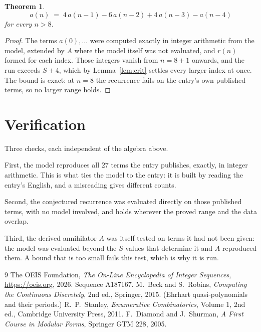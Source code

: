 \documentclass[11pt,a4paper]{article}
\theoremstyle{plain}
\newtheorem{theorem}{Theorem}
\theoremstyle{definition}
\begin{document}
\begin{theorem}
\[
a(n)\;=\;4\,a(n-1) - 6\,a(n-2) + 4\,a(n-3) - a(n-4)
\]
for every $n>8$.
\end{theorem}

\begin{proof}
The terms $a(0),\dots$ were computed exactly in integer arithmetic from the model, extended by
$A$ where the model itself was not evaluated, and $r(n)$ formed for each index. Those integers
vanish from $n=8+1$ onwards, and the run exceeds $S+4$, which by
Lemma~\ref{lem:crit} settles every larger index at once. The bound is exact: at $n=8$ the recurrence fails on the entry's own published terms, so no larger range holds.
\end{proof}

\section{Verification}

Three checks, each independent of the algebra above.

First, the model reproduces all $27$ terms the entry publishes, exactly, in integer
arithmetic. This is what ties the model to the entry: it is built by reading the entry's
English, and a misreading gives different counts.

Second, the conjectured recurrence was evaluated directly on those published terms, with no
model involved, and holds wherever the proved range and the data overlap.

Third, the derived annihilator $A$ was itself tested on terms it had not been given: the model
was evaluated beyond the $S$ values that determine it and $A$ reproduced them. A bound that is
too small fails this test, which is why it is run.

\begin{thebibliography}{9}
 The OEIS Foundation, \emph{The On-Line Encyclopedia of Integer
Sequences}, \url{https://oeis.org}, 2026. Sequence A187167.
 M.~Beck and S.~Robins, \emph{Computing the Continuous Discretely},
2nd ed., Springer, 2015. (Ehrhart quasi-polynomials and their periods.)
 R.~P.~Stanley, \emph{Enumerative Combinatorics}, Volume 1, 2nd ed.,
Cambridge University Press, 2011.
 F.~Diamond and J.~Shurman, \emph{A First Course in Modular Forms},
Springer GTM 228, 2005.
\end{thebibliography}
\end{document}
